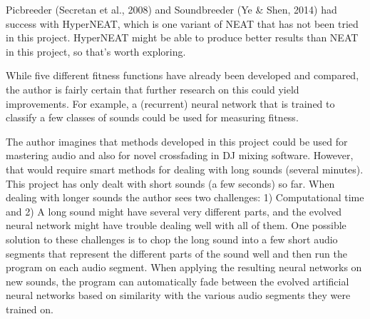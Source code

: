 Picbreeder (Secretan et al., 2008) and Soundbreeder (Ye \& Shen, 2014) had success with HyperNEAT, which is one variant of NEAT that has not been tried in this project. HyperNEAT might be able to produce better results than NEAT in this project, so that’s worth exploring.

While five different fitness functions have already been developed and compared, the author is fairly certain that further research on this could yield improvements. For example, a (recurrent) neural network that is trained to classify a few classes of sounds could be used for measuring fitness.

The author imagines that methods developed in this project could be used for mastering audio and also for novel crossfading in DJ mixing software. However, that would require smart methods for dealing with long sounds (several minutes). This project has only dealt with short sounds (a few seconds) so far. When dealing with longer sounds the author sees two challenges: 1) Computational time and 2) A long sound might have several very different parts, and the evolved neural network might have trouble dealing well with all of them. One possible solution to these challenges is to chop the long sound into a few short audio segments that represent the different parts of the sound well and then run the program on each audio segment. When applying the resulting neural networks on new sounds, the program can automatically fade between the evolved artificial neural networks based on similarity with the various audio segments they were trained on.